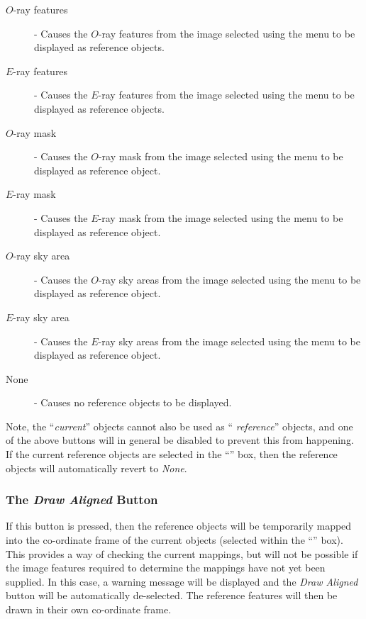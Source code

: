 \begin{description}

\item [$O$-ray features] - Causes the $O$-ray features from the image
selected using the  menu to
be displayed as reference objects.

\item [$E$-ray features] - Causes the $E$-ray features from the image
selected using the  menu to
be displayed as reference objects.

\item [$O$-ray mask] - Causes the $O$-ray mask from the image
selected using the  menu to
be displayed as reference object.

\item [$E$-ray mask] - Causes the $E$-ray mask from the image
selected using the  menu to
be displayed as reference object.

\item [$O$-ray sky area] - Causes the $O$-ray sky areas from the image
selected using the  menu to
be displayed as reference object.

\item [$E$-ray sky area] - Causes the $E$-ray sky areas from the image
selected using the  menu to
be displayed as reference object.

\item [None] - Causes no reference objects to be displayed.

\end{description}

Note, the ``{\em current}'' objects cannot also be used as ``{\em
reference}'' objects, and one of the above buttons will in general be
disabled to prevent this from happening. If the current reference objects are
selected in the ``'' box, then the 
reference objects will automatically revert to {\em None}.

\subsubsection {The {\em Draw Aligned} Button}
If this button is pressed, then the reference objects will be temporarily
mapped into the co-ordinate frame of the current objects (selected within
the ``'' box). This provides a
way of checking the current mappings, but will not be possible if the
image features required to determine the mappings have not yet been
supplied. In this case, a warning message will be displayed and the {\em
Draw Aligned} button will be automatically de-selected. The reference
features will then be drawn in their own co-ordinate frame.

